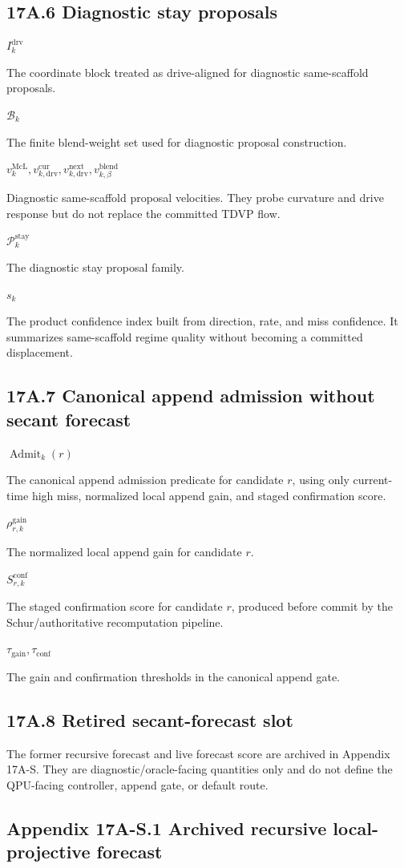 \documentclass[10pt]{article}
\newcommand{\sym}[2]{%
  \noindent\begin{minipage}[t]{0.29\textwidth}\raggedright\textbf{\ensuremath{#1}}\end{minipage}%
  \hfill
  \begin{minipage}[t]{0.68\textwidth}\raggedright #2\end{minipage}\par\vspace{0.22em}}
\begin{document}
\subsection*{17A.6 Diagnostic stay proposals}

\sym{I_k^{\mathrm{drv}}}{The coordinate block treated as drive-aligned for diagnostic same-scaffold proposals.}
\sym{\mathcal B_k}{The finite blend-weight set used for diagnostic proposal construction.}
\sym{v_k^{\mathrm{McL}},v_{k,\mathrm{drv}}^{\mathrm{cur}},v_{k,\mathrm{drv}}^{\mathrm{next}},v_{k,\beta}^{\mathrm{blend}}}{Diagnostic same-scaffold proposal velocities. They probe curvature and drive response but do not replace the committed TDVP flow.}
\sym{\mathcal P_k^{\mathrm{stay}}}{The diagnostic stay proposal family.}
\sym{s_k}{The product confidence index built from direction, rate, and miss confidence. It summarizes same-scaffold regime quality without becoming a committed displacement.}

\subsection*{17A.7 Canonical append admission without secant forecast}

\sym{\operatorname{Admit}_k(r)}{The canonical append admission predicate for candidate $r$, using only current-time high miss, normalized local append gain, and staged confirmation score.}
\sym{\rho_{r,k}^{\mathrm{gain}}}{The normalized local append gain for candidate $r$.}
\sym{S_{r,k}^{\mathrm{conf}}}{The staged confirmation score for candidate $r$, produced before commit by the Schur/authoritative recomputation pipeline.}
\sym{\tau_{\mathrm{gain}},\tau_{\mathrm{conf}}}{The gain and confirmation thresholds in the canonical append gate.}

\subsection*{17A.8 Retired secant-forecast slot}

The former recursive forecast and live forecast score are archived in Appendix 17A-S. They are diagnostic/oracle-facing quantities only and do not define the QPU-facing controller, append gate, or default route.

\subsection*{Appendix 17A-S.1 Archived recursive local-projective forecast}
\end{document}
